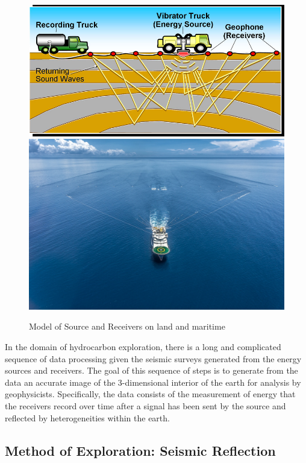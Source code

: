 \begin{figure}[ht]
	\centering
	\includegraphics[width=0.39\textheight]{Images/SeismicChes5.jpg}
	\includegraphics[width=0.3\textheight]{Images/2562_geo_coral_large.jpg}
	\caption{Model of Source and Receivers on land and maritime}
	\label{fig:Sesmic-Acquisition}
\end{figure}

In the domain of hydrocarbon exploration, there is a long and complicated sequence of data processing given the seismic surveys generated from the energy sources and receivers. The goal of this sequence of steps is to generate from the data an accurate image of the 3-dimensional interior of the earth for analysis by geophysicists. Specifically, the data consists of the measurement of energy that the receivers record over time after a signal has been sent by the source and reflected by heterogeneities within the earth.

\subsection{Method of Exploration: Seismic Reflection}


